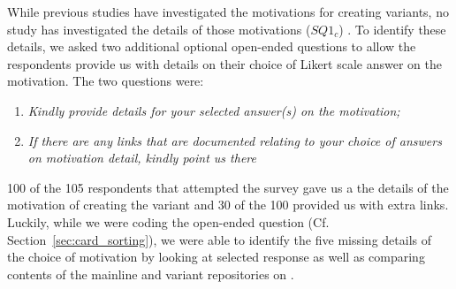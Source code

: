 
While previous studies have investigated the motivations for creating variants, no study has investigated the details of those motivations ($SQ1_{c}$) .
To identify these details, we asked two additional optional open-ended questions to allow the respondents provide us with details on their choice of Likert scale answer on the motivation. The two questions were: 
\begin{enumerate}
	\item \emph{Kindly provide details for your selected answer(s) on the motivation; }
	\item \emph{If there are any links that are documented relating to your choice of answers on motivation detail, kindly point us there}
\end{enumerate}

100 of the 105 respondents that attempted the survey gave us a the details of the motivation of creating the variant and 30 of the 100 provided us with extra links. Luckily, while we were coding the open-ended question (Cf. Section~\ref{sec:card_sorting}), we were able to identify the five missing details of the choice of motivation by looking at selected response as well as comparing contents of the mainline and variant repositories on \gh.

